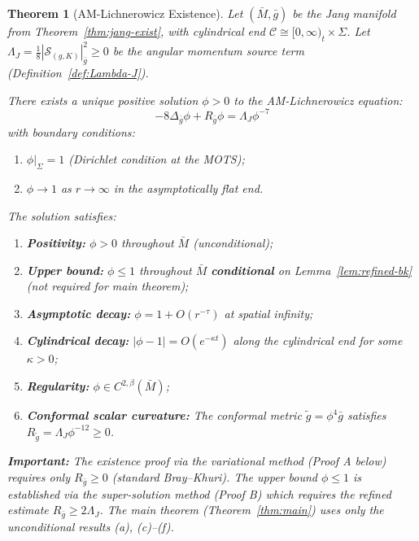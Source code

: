 \documentclass[12pt]{article}
\theoremstyle{plain}
\newtheorem{theorem}{Theorem}[section]
\theoremstyle{definition}
\theoremstyle{remark}
\newcommand{\tg}{\tilde{g}}
\newcommand{\bg}{\bar{g}}
\newcommand{\bM}{\bar{M}}
\newcommand{\Hoelder}{\beta}
\begin{document}
\begin{theorem}[AM-Lichnerowicz Existence]\label{thm:lich-exist}
Let $(\bM, \bg)$ be the Jang manifold from Theorem~\ref{thm:jang-exist}, with cylindrical end $\mathcal{C} \cong [0,\infty)_t \times \Sigma$. Let $\Lambda_J = \frac{1}{8}|\mathcal{S}_{(g,K)}|^2_{\bg} \geq 0$ be the angular momentum source term (Definition~\ref{def:Lambda-J}).

There exists a unique positive solution $\phi > 0$ to the AM-Lichnerowicz equation:
\begin{equation}\label{eq:am-lich-exist}
-8\Delta_{\bg}\phi + R_{\bg}\phi = \Lambda_J \phi^{-7}
\end{equation}
with boundary conditions:
\begin{enumerate}[label=\textup{(\roman*)}]
    \item $\phi|_\Sigma = 1$ (Dirichlet condition at the MOTS);
    \item $\phi \to 1$ as $r \to \infty$ in the asymptotically flat end.
\end{enumerate}

The solution satisfies:
\begin{enumerate}[label=\textup{(\alph*)}]
    \item \textbf{Positivity:} $\phi > 0$ throughout $\bM$ (unconditional);
    \item \textbf{Upper bound:} $\phi \leq 1$ throughout $\bM$ \textbf{conditional} on Lemma~\ref{lem:refined-bk} (not required for main theorem);
    \item \textbf{Asymptotic decay:} $\phi = 1 + O(r^{-\tau})$ at spatial infinity;
    \item \textbf{Cylindrical decay:} $|\phi - 1| = O(e^{-\kappa t})$ along the cylindrical end for some $\kappa > 0$;
    \item \textbf{Regularity:} $\phi \in C^{2,\Hoelder}(\bM)$;
    \item \textbf{Conformal scalar curvature:} The conformal metric $\tg = \phi^4 \bg$ satisfies $R_{\tg} = \Lambda_J \phi^{-12} \geq 0$.
\end{enumerate}

\textbf{Important:} The existence proof via the variational method (Proof A below) requires only $R_{\bg} \geq 0$ (standard Bray--Khuri). The upper bound $\phi \leq 1$ is established via the super-solution method (Proof B) which requires the refined estimate $R_{\bg} \geq 2\Lambda_J$. The main theorem (Theorem~\ref{thm:main}) uses only the unconditional results (a), (c)--(f).
\end{theorem}
\end{document}

